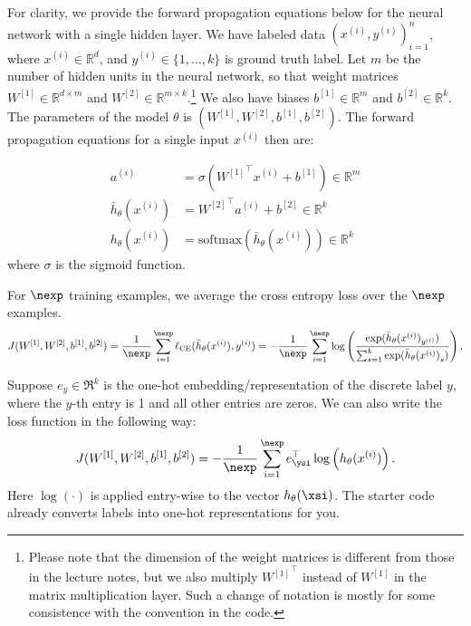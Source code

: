

For clarity, we provide the forward propagation equations below for the neural network with a single hidden layer. We have labeled data $(x^{(i)}, y^{(i)})_{i=1}^n$, where $x^{(i)} \in \mathbb{R}^d$, and $y^{(i)} \in \{1,\dots, k\}$ is ground truth label. Let $m$ be the number of hidden units in the neural network, so that weight matrices $W^{[1]} \in \mathbb{R}^{d \times m}$ and $W^{[2]} \in \mathbb{R}^{m \times k}$.\footnote{Please note that the dimension of the weight matrices is different from those in the lecture notes, but we also multiply ${W^{[1]}}^\top$ instead of $W^{[1]}$ in the matrix multiplication layer.  Such a change of notation is mostly for some consistence with the convention in the code.}  We also have biases $b^{[1]} \in \mathbb{R}^m$ and $b^{[2]} \in \mathbb{R}^k$. The parameters of the model $\theta$ is $(W^{[1]},W^{[2]},b^{[1]},b^{[2]})$. The forward propagation equations for a single input $x^{(i)}$ then are:

\begin{align*}
  a^{(i)} &= \sigma \left( {W^{[1]}}^\top x^{(i)}  + b^{[1]} \right)  \in \mathbb{R}^m \\
  \bar{h}_{\theta}(x^{(i)})&= {W^{[2]}}^\top a^{(i)} + b^{[2]} \in \mathbb{R}^k \\
  {h}_{\theta}(x^{(i)}) &=  \mathrm{softmax}(\bar{h}_{\theta}(x^{(i)})) \in \mathbb{R}^k
\end{align*}
where $\sigma$ is the sigmoid function. 

For $\nexp$ training examples, we average the cross entropy loss over the $\nexp$ examples.
  \begin{equation*}
  J(W^{[1]},W^{[2]},b^{[1]},b^{[2]}) = \frac{1}{\nexp}\sum_{i=1}^\nexp \ell_\textup{CE}(\bar{h}_{\theta}(x^{(i)}),y^{(i)})  = - \frac{1}{\nexp}\sum_{i=1}^\nexp \log\left(\frac{\exp(\bar{h}_{\theta}(x^{(i)})_{y^{(i)}})}{\sum_{s=1}^{k}\exp({\bar{h}_{\theta}(x^{(i)})}_s)}\right).
  \end{equation*}

Suppose $e_y\in \Re^k$ is the one-hot embedding/representation of the discrete label $y$, where the $y$-th entry is 1 and all other entries are zeros. We can also write the loss function in the following way:
  \begin{equation*}
  J(W^{[1]},W^{[2]},b^{[1]},b^{[2]}) = - \frac{1}{\nexp}\sum_{i=1}^\nexp e_{\ysi}^\top\log\left(h_\theta(x^{(i)})\right).
  \end{equation*}
Here $\log(\cdot)$ is applied entry-wise to the vector $h_\theta(\xsi)$. The starter code already converts labels into one-hot representations for you.


